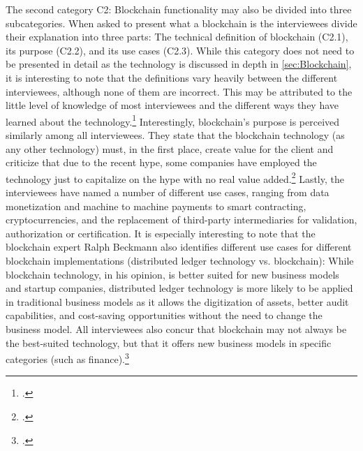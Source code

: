 The second category C2: Blockchain functionality may also be divided into three subcategories. When asked to present what a blockchain is the interviewees divide their explanation into three parts: The technical definition of blockchain (C2.1), its purpose (C2.2), and its use cases (C2.3). While this category does not need to be presented in detail as the technology is discussed in depth in \ref{sec:Blockchain}, it is interesting to note that the definitions vary heavily between the different interviewees, although none of them are incorrect. This may be attributed to the little level of knowledge of most interviewees and the different ways they have learned about the technology.\footcites[Cf.][P3]{DanielKaltenbach_Interview}[cf.][P58]{BjoernPaulewicz_Interview}[cf.][P91]{RalphBeckmann_Interview} Interestingly, blockchain's purpose is perceived similarly among all interviewees. They state that the blockchain technology (as any other technology) must, in the first place, create value for the client and criticize that due to the recent hype, some companies have employed the technology just to capitalize on the hype with no real value added.\footcites[Cf.][P23, P25, P26, P27]{DanielKaltenbach_Interview}[cf.][P69]{BjoernPaulewicz_Interview}[cf.][P92, P114, P117]{RalphBeckmann_Interview} Lastly, the interviewees have named a number of different use cases, ranging from data monetization and machine to machine payments to smart contracting, cryptocurrencies, and the replacement of third-party intermediaries for validation, authorization or certification. It is especially interesting to note that the blockchain expert Ralph Beckmann also identifies different use cases for different blockchain implementations (distributed ledger technology vs. blockchain): While blockchain technology, in his opinion, is better suited for new business models and startup companies, distributed ledger technology is more likely to be applied in traditional business models as it allows the digitization of assets, better audit capabilities, and cost-saving opportunities without the need to change the business model. All interviewees also concur that blockchain may not always be the best-suited technology, but that it offers new business models in specific categories (such as finance).\footcites[Cf.][P14, P17]{DanielKaltenbach_Interview}[cf.][P57, P80, P77]{BjoernPaulewicz_Interview}[cf.][P103, P194, P105, P106, P107]{RalphBeckmann_Interview}


